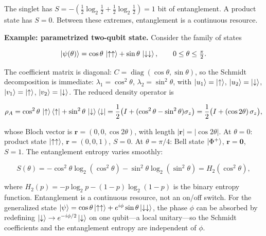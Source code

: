 The singlet has $S = -(\frac12\log_2\frac12 + \frac12\log_2\frac12) = 1$ bit of entanglement. A product state has $S = 0$. Between these extremes, entanglement is a continuous resource.

\medskip\noindent\textbf{Example: parametrized two-qubit state.}
Consider the family of states
\begin{linenomath}
\begin{equation}
\ket{\psi(\theta)} = \cos\theta\,\ket{\uparrow\uparrow} + \sin\theta\,\ket{\downarrow\downarrow},
\qquad 0 \le \theta \le \tfrac{\pi}{2}.
\end{equation}
\end{linenomath}
The coefficient matrix is diagonal: $C = \operatorname{diag}(\cos\theta, \sin\theta)$, so the Schmidt decomposition is immediate: $\lambda_1 = \cos^2\theta$, $\lambda_2 = \sin^2\theta$, with $\ket{u_1} = \ket{\uparrow}$, $\ket{u_2} = \ket{\downarrow}$, $\ket{v_1} = \ket{\uparrow}$, $\ket{v_2} = \ket{\downarrow}$. The reduced density operator is
\begin{linenomath}
\begin{equation}
\rho_A = \cos^2\theta\,\ket{\uparrow}\bra{\uparrow} + \sin^2\theta\,\ket{\downarrow}\bra{\downarrow}
= \frac12\bigl(I + (\cos^2\theta - \sin^2\theta)\sigma_z\bigr)
= \frac12\bigl(I + (\cos 2\theta)\,\sigma_z\bigr),
\end{equation}
\end{linenomath}
whose Bloch vector is $\bm r = (0, 0, \cos 2\theta)$, with length $\lvert\bm r\rvert = \lvert\cos 2\theta\rvert$. At $\theta = 0$: product state $\ket{\uparrow\uparrow}$, $\bm r = (0,0,1)$, $S = 0$. At $\theta = \pi/4$: Bell state $\ket{\Phi^+}$, $\bm r = \bm 0$, $S = 1$. The entanglement entropy varies smoothly:
\begin{linenomath}
\begin{equation}
S(\theta) = -\cos^2\theta\log_2(\cos^2\theta) - \sin^2\theta\log_2(\sin^2\theta) = H_2(\cos^2\theta),
\end{equation}
\end{linenomath}
where $H_2(p) = -p\log_2 p - (1-p)\log_2(1-p)$ is the binary entropy function. Entanglement is a continuous resource, not an on/off switch. For the generalized state $\ket{\psi} = \cos\theta\ket{\uparrow\uparrow} + e^{i\phi}\sin\theta\ket{\downarrow\downarrow}$, the phase $\phi$ can be absorbed by redefining $\ket{\downarrow} \to e^{-i\phi/2}\ket{\downarrow}$ on one qubit---a local unitary---so the Schmidt coefficients and the entanglement entropy are independent of $\phi$.

